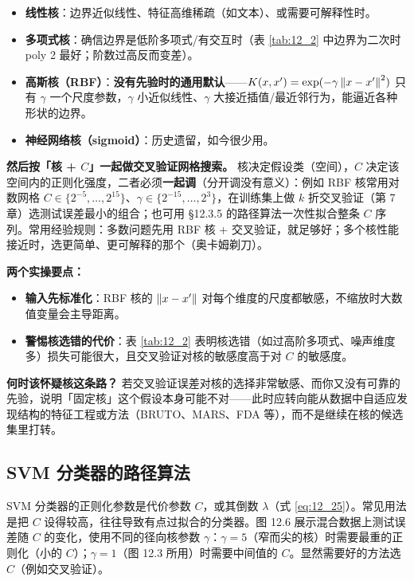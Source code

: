 \begin{itemize}
\item \textbf{线性核}：边界近似线性、特征高维稀疏（如文本）、或需要可解释性时。
\item \textbf{多项式核}：确信边界是低阶多项式/有交互时（表 \ref{tab:12_2} 中边界为二次时 poly 2 最好；阶数过高反而变差）。
\item \textbf{高斯核（RBF）}：\textbf{没有先验时的通用默认}——$K(x,x')=\exp(-\gamma\left\lVert x-x'\right\rVert^2)$ 只有 $\gamma$ 一个尺度参数，$\gamma$ 小近似线性、$\gamma$ 大接近插值/最近邻行为，能逼近各种形状的边界。
\item \textbf{神经网络核（sigmoid）}：历史遗留，如今很少用。
\end{itemize}

\textbf{然后按「核 + $C$」一起做交叉验证网格搜索。} 核决定假设类（空间），$C$ 决定该空间内的正则化强度，二者必须\textbf{一起调}（分开调没有意义）：例如 RBF 核常用对数网格 $C\in\{2^{-5},\dots,2^{15}\}$、$\gamma\in\{2^{-15},\dots,2^{3}\}$，在训练集上做 $k$ 折交叉验证（第 7 章）选测试误差最小的组合；也可用 §12.3.5 的路径算法一次性拟合整条 $C$ 序列。常用经验规则：多数问题先用 RBF 核 + 交叉验证，就足够好；多个核性能接近时，选更简单、更可解释的那个（奥卡姆剃刀）。

\textbf{两个实操要点：}
\begin{itemize}
\item \textbf{输入先标准化}：RBF 核的 $\left\lVert x-x'\right\rVert$ 对每个维度的尺度都敏感，不缩放时大数值变量会主导距离。
\item \textbf{警惕核选错的代价}：表 \ref{tab:12_2} 表明核选错（如过高阶多项式、噪声维度多）损失可能很大，且交叉验证对核的敏感度高于对 $C$ 的敏感度。
\end{itemize}

\textbf{何时该怀疑核这条路？} 若交叉验证误差对核的选择非常敏感、而你又没有可靠的先验，说明「固定核」这个假设本身可能不对——此时应转向能从数据中自适应发现结构的特征工程或方法（BRUTO、MARS、FDA 等），而不是继续在核的候选集里打转。

\subsection{SVM 分类器的路径算法}

SVM 分类器的正则化参数是代价参数 $C$，或其倒数 $\lambda$（式 \ref{eq:12_25}）。常见用法是把 $C$ 设得较高，往往导致有点过拟合的分类器。图 12.6 展示混合数据上测试误差随 $C$ 的变化，使用不同的径向核参数 $\gamma$：$\gamma=5$（窄而尖的核）时需要最重的正则化（小的 $C$）；$\gamma=1$（图 12.3 所用）时需要中间值的 $C$。显然需要好的方法选 $C$（例如交叉验证）。

